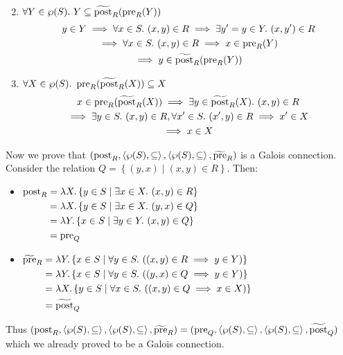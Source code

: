 \begin{exercise}
\begin{enumerate}[1.]
\begin{gather*}
        \end{gather*}
        \item $\forall Y \in \wp(S).\ Y \subseteq \widetilde{\operatorname{post}}_R(\operatorname{pre}_R(Y))$
        \begin{gather*}
            y \in Y \implies \forall x \in S.\ (x, y) \in R \implies \exists y' = y \in Y.\ (x, y') \in R \\
            \implies \forall x \in S.\ (x, y) \in R \implies x \in \operatorname{pre}_R(Y) \\
            \implies y \in \widetilde{\operatorname{post}}_R(\operatorname{pre}_R(Y))
        \end{gather*}
        \item $\forall X \in \wp(S).\ \pre_R(\widetilde{\post}_R(X)) \subseteq X$
        \begin{gather*}
            x \in \pre_R(\widetilde{\post}_R(X)) \implies \exists y \in \widetilde{\post}_R(X).\ (x, y) \in R \\
            \implies \exists y \in S.\ (x, y) \in R, \forall x' \in S.\ (x', y) \in R \implies x' \in X \\
            \implies x \in X
        \end{gather*}
    \end{enumerate}
    Now we prove that $(\operatorname{post}_R, \left<\wp(S), \subseteq\right>, \left<\wp(S), \subseteq\right>, \widetilde{\operatorname{pre}}_R)$ is a Galois connection. Consider the relation $Q = \left\{(y, x) \mid (x, y) \in R\right\}$. Then:
    \begin{itemize}
        \item $\!\begin{aligned}[t]
            \operatorname{post}_R
            &= \lambda X. \left\{ y \in S \mid \exists x \in X.\ (x, y) \in R \right\} \\
            &= \lambda X. \left\{ y \in S \mid \exists x \in X.\ (y, x) \in Q \right\} \\
            &= \lambda Y. \left\{ x \in S \mid \exists y \in Y.\ (x, y) \in Q \right\} \\
            &= \operatorname{pre}_Q
        \end{aligned}$
        \item $\!\begin{aligned}[t]
            \widetilde{\pre}_R
            &= \lambda Y. \left\{ x \in S \mid \forall y \in S.\ ((x, y) \in R \implies y \in Y)\right\} \\
            &= \lambda Y. \left\{ x \in S \mid \forall y \in S.\ ((y, x) \in Q \implies y \in Y)\right\} \\
            &= \lambda X. \left\{ y \in S \mid \forall x \in S.\ ((x, y) \in Q \implies x \in X)\right\} \\
            &= \widetilde{\post}_Q
        \end{aligned}$
    \end{itemize}
    Thus $(\operatorname{post}_R, \left<\wp(S), \subseteq\right>, \left<\wp(S), \subseteq\right>, \widetilde{\operatorname{pre}}_R) = (\operatorname{pre}_Q, \left<\wp(S), \subseteq\right>, \left<\wp(S), \subseteq\right>, \widetilde{\operatorname{post}}_Q)$ which we already proved to be a Galois connection.
\end{exercise}
